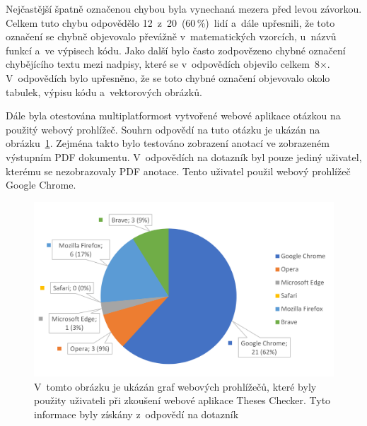 Nejčastější špatně označenou chybou byla vynechaná mezera před levou závorkou. 
Celkem tuto chybu odpovědělo 12~z~20~(60\,\%)~lidí a~dále upřesnili, že
toto označení se chybně objevovalo převážně v~matematických vzorcích, u~názvů
funkcí a~ve výpisech kódu. Jako další bylo často zodpovězeno chybné označení
chybějícího textu mezi nadpisy, které se v~odpovědích objevilo celkem~8$\times$.
V~odpovědích bylo upřesněno, že se toto chybné označení objevovalo
okolo tabulek, výpisu kódu a~vektorových obrázků.

Dále byla otestována multiplatformost vytvořené webové aplikace otázkou
na použitý webový prohlížeč. Souhrn odpovědí na tuto otázku je ukázán na
obrázku~\ref{pic_graph_browser}. Zejména takto bylo testováno zobrazení
anotací ve zobrazeném výstupním PDF dokumentu. V~odpovědích na dotazník
byl pouze jediný uživatel, kterému se nezobrazovaly PDF anotace. Tento 
uživatel použil webový prohlížeč Google Chrome.

\begin{figure}[H]
    \centering
    \includegraphics[width=0.85\linewidth]{obrazky-figures/graph_browser.pdf}
    \caption{
        V~tomto obrázku je ukázán graf webových prohlížečů, které byly
        použity uživateli při zkoušení webové aplikace Theses Checker.
        Tyto informace byly získány z~odpovědí na dotazník
    }
    \label{pic_graph_browser}
\end{figure}

